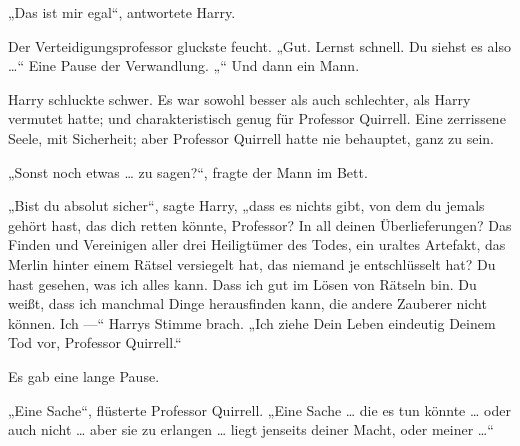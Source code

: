 „Das ist mir egal“, antwortete Harry.

Der Verteidigungsprofessor gluckste feucht.
„Gut. Lernst schnell. Du siehst es also …“ Eine Pause der Verwandlung. „“ Und dann ein Mann.

Harry schluckte schwer. Es war sowohl besser als auch schlechter, als Harry vermutet hatte; und charakteristisch genug für Professor Quirrell. Eine zerrissene Seele, mit Sicherheit; aber Professor Quirrell hatte nie behauptet, ganz zu sein.

„Sonst noch etwas … zu sagen?“, fragte der Mann im Bett.

„Bist du absolut sicher“, sagte Harry, „dass es nichts gibt, von dem du jemals gehört hast, das dich retten könnte, Professor? In all deinen Überlieferungen? Das Finden und Vereinigen aller drei Heiligtümer des Todes, ein uraltes Artefakt, das Merlin hinter einem Rätsel versiegelt hat, das niemand je entschlüsselt hat? Du hast gesehen, was ich alles kann. Dass ich gut im Lösen von Rätseln bin. Du weißt, dass ich manchmal Dinge herausfinden kann, die andere Zauberer nicht können. Ich —“
Harrys Stimme brach.
„Ich ziehe Dein Leben eindeutig Deinem Tod vor, Professor Quirrell.“

Es gab eine lange Pause.

„Eine Sache“, flüsterte Professor Quirrell.
„Eine Sache … die es tun könnte … oder auch nicht … aber sie zu erlangen … liegt jenseits deiner Macht, oder meiner …“

